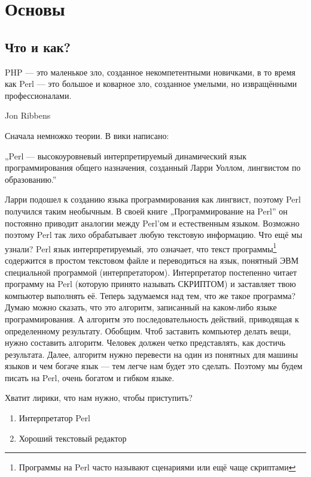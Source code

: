 \section{Основы}
\subsection{Что и как?}
\begin{em}
PHP — это маленькое зло, созданное некомпетентными новичками, в то
время как Perl — это большое и коварное зло, созданное умелыми, но 
извращёнными профессионалами.
\begin{flushright}
Jon Ribbens
\end{flushright}
\end{em}

Сначала немножко теории. В вики написано:

\begin{em}
„Perl — высокоуровневый интерпретируемый динамический язык
программирования общего назначения, созданный Ларри Уоллом, лингвистом
по образованию.”
\end{em}

Ларри подошел к созданию языка программирования как лингвист,
поэтому Perl получился таким необычным.
В своей книге „Программирование на Perl” он постоянно приводит аналогии
между Perl’ом и естественным языком.
Возможно поэтому Perl так лихо обрабатывает любую текстовую информацию.
Что ещё мы узнали? Perl язык интерпретируемый, это означает, что текст
программы\footnote{Программы на Perl часто называют
сценариями или ещё чаще скриптами}
содержится в простом текстовом файле и переводиться на язык,
понятный ЭВМ специальной программой (интерпретатором).
Интерпретатор постепенно читает программу на Perl
(которую принято называть СКРИПТОМ) и заставляет твою компьютер
выполнять её. Теперь задумаемся над тем, что же такое программа?
Думаю можно сказать, что это алгоритм, записанный на каком-либо языке
программирования. А алгоритм это последовательность действий, приводящая
к определенному результату. Обобщим. Чтоб заставить компьютер делать вещи,
нужно составить алгоритм. Человек должен четко представлять,
как достичь результата. Далее, алгоритм нужно перевести на один из
понятных для машины языков и чем богаче язык — тем легче нам будет это
сделать. Поэтому мы будем писать на Perl, очень богатом и гибком языке.

Хватит лирики, что нам нужно, чтобы приступить?
\begin{enumerate}
\item Интерпретатор Perl
\item Хороший текстовый редактор
\end{enumerate}

